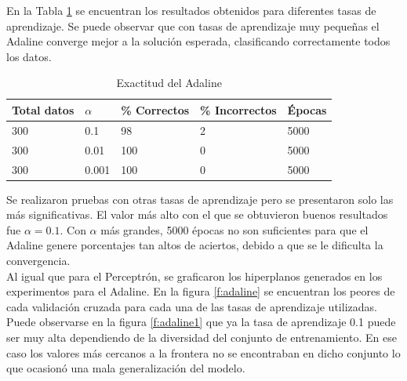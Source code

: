 \documentclass[a4paper]{article}
\begin{document}
		En la Tabla \ref{tabla:accAdaline} se encuentran los resultados obtenidos para diferentes tasas de aprendizaje.
		Se puede observar que con tasas de aprendizaje muy pequeñas el Adaline converge mejor a la solución esperada, clasificando correctamente todos los datos.
		\begin{table}[H]
		\begin{center}
		\begin{tabular}{|l|l|l|l|l|}
		\hline
		Total datos & $\alpha$ & \% Correctos & \% Incorrectos & Épocas\\
		\hline \hline
		300 & 0.1 & 98 & 2 & 5000\\ \hline
		300 & 0.01 & 100 & 0 & 5000\\ \hline
		300 & 0.001 & 100 & 0 & 5000\\ \hline
		\end{tabular}
		\caption{Exactitud del Adaline}
		\label{tabla:accAdaline}
		\end{center}
		\end{table}
		
		Se realizaron pruebas con otras tasas de aprendizaje pero se presentaron solo las más significativas. El valor más alto con el que se obtuvieron buenos resultados fue $\alpha=0.1$. Con $\alpha$ más grandes, 5000 épocas no son suficientes para que el Adaline genere porcentajes tan altos de aciertos, debido a que se le dificulta la convergencia.\\
		
		Al igual que para el Perceptrón, se graficaron los hiperplanos generados en los experimentos para el Adaline. En la figura \ref{f:adaline} se encuentran los peores de cada validación cruzada para cada una de las tasas de aprendizaje utilizadas. Puede observarse en la figura \ref{f:adaline1} que ya la tasa de aprendizaje 0.1 puede ser muy alta dependiendo de la diversidad del conjunto de entrenamiento. En ese caso los valores más cercanos a la frontera no se encontraban en dicho conjunto lo que ocasionó una mala generalización del modelo.
		
\end{document}
